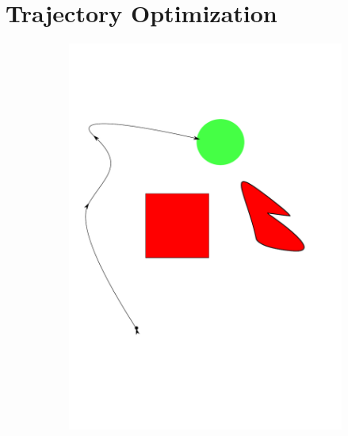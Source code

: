 \documentclass[../thesis.tex]{subfiles}
\begin{document}
\section{Trajectory Optimization}

\begin{figure}
  \centering
  \begin{subfigure}[b]{0.24\linewidth}
    \includegraphics[width=\linewidth]{./Planning/trajectory_1.pdf}
  \end{subfigure}
  \hfill
  \begin{subfigure}[b]{0.24\linewidth}

\end{subfigure}
\end{figure}
\end{document}

